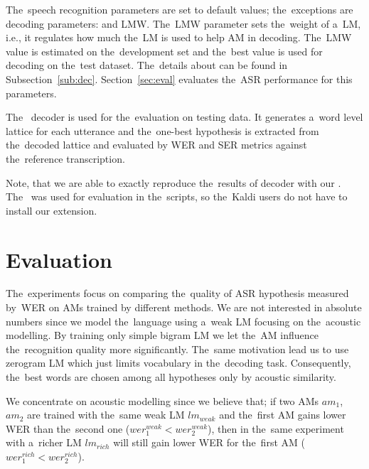 The~speech recognition parameters are set to default values; the~exceptions are decoding parameters:  and \acl{LMW}. 
The~\ac{LMW} parameter sets the~weight of a~\ac{LM}, i.e., it regulates how much the~\ac{LM} is used to help \ac{AM} in decoding. 
The~\ac{LMW} value is estimated on the~development set and the~best value is used for decoding on the~test dataset.
The~details about  can be found in Subsection~\ref{sub:dec}.
Section~\ref{sec:eval} evaluates the~\ac{ASR} performance for this parameters.

The~ decoder is used for the~evaluation on testing data.
It generates a~word level lattice for each utterance and the~one-best hypothesis is extracted from the~decoded lattice and evaluated by \ac{WER} and \ac{SER} metrics against the~reference transcription.

Note, that we are able to exactly reproduce the~results of  decoder with our .
The~ was used for evaluation in the~scripts, so the~Kaldi users do not have to install our extension.

\section{Evaluation}
\label{sec:am_eval}

The~experiments focus on comparing the~quality of ASR hypothesis measured by~\ac{WER} on \acp{AM} trained by different methods.
We are not interested in absolute numbers since we model the~language using a~weak \ac{LM} focusing on the~acoustic modelling.
By training only simple bigram \ac{LM} we let the~\ac{AM} influence the~recognition quality more significantly. 
The~same motivation lead us to use zerogram \ac{LM} which just limits vocabulary in the~decoding task. %
Consequently, the~best words are chosen among all hypotheses only by acoustic similarity.

We concentrate on acoustic modelling since we believe that; if two \acp{AM} $am_1$, $am_2$ are trained with the~same weak \acl{LM} $lm_{weak}$ and the~first \ac{AM} gains lower \ac{WER} than the~second one ($wer^{weak}_{1} <  wer^{weak}_{2}$), then in the~same experiment with a~richer \ac{LM} $lm_{rich}$ will still gain lower \ac{WER} for the~first \ac{AM} ($wer^{rich}_{1} <  wer^{rich}_{2}$).


